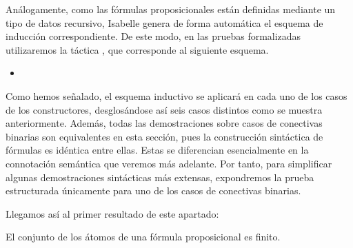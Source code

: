 \begin{isabellebody}
\begin{isamarkuptext}
  Análogamente, como las fórmulas proposicionales están definidas mediante un tipo de datos 
  recursivo, Isabelle genera de forma automática el esquema de inducción correspondiente. De este
  modo, en las pruebas formalizadas utilizaremos la táctica , que corresponde al 
  siguiente esquema.

  \begin{itemize}
    \item[] 
  \end{itemize} 

  Como hemos señalado, el esquema inductivo se aplicará en cada uno de los casos de los 
  constructores, desglosándose así seis casos distintos como se muestra anteriormente. 
  Además, todas las demostraciones sobre casos de conectivas binarias
  son equivalentes en esta sección, pues la construcción sintáctica de fórmulas es idéntica entre 
  ellas. Estas se diferencian esencialmente en la connotación semántica que veremos más adelante. 
  Por tanto, para simplificar algunas demostraciones sintácticas más extensas, expondremos la prueba
  estructurada únicamente para uno de los casos de conectivas binarias.

  Llegamos así al primer resultado de este apartado:

    \begin{lema}
      El conjunto de los átomos de una fórmula proposicional es finito.
    \end{lema}


\end{isamarkuptext}
\end{isabellebody}
